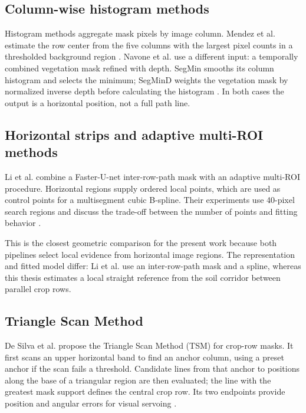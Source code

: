 \subsection{Column-wise histogram methods}
\label{subsec:metodi_locali}

Histogram methods aggregate mask pixels by image column. Mendez et al.
estimate the row center from the five columns with the largest pixel
counts in a thresholded background region
\cite[Section~3.4.3]{mendez2023vineyards}. Navone et al. use a different
input: a temporally combined vegetation mask refined with depth. SegMin
smooths its column histogram and selects the minimum; SegMinD weights
the vegetation mask by normalized inverse depth before calculating the
histogram \cite[Section~3]{navone2025gpsfree}. In both cases the output
is a horizontal position, not a full path line.

\subsection{Horizontal strips and adaptive multi-ROI methods}
\label{subsec:strips}

Li et al. combine a Faster-U-net inter-row-path mask with an adaptive
multi-ROI procedure. Horizontal regions supply ordered local points,
which are used as control points for a multisegment cubic B-spline.
Their experiments use 40-pixel search regions and discuss the trade-off
between the number of points and fitting behavior
\cite[Section~2.2.3, Figure~9]{li2022multiroi}.

This is the closest geometric comparison for the present work because
both pipelines select local evidence from horizontal image regions.
The representation and fitted model differ: Li et al. use an
inter-row-path mask and a spline, whereas this thesis estimates a local
straight reference from the soil corridor between parallel crop rows.

\subsection{Triangle Scan Method}
\label{subsec:triangle_scan}

De Silva et al. propose the Triangle Scan Method (TSM) for crop-row
masks. It first scans an upper horizontal band to find an anchor column,
using a preset anchor if the scan fails a threshold. Candidate lines
from that anchor to positions along the base of a triangular region are
then evaluated; the line with the greatest mask support defines the
central crop row. Its two endpoints provide position and angular errors
for visual servoing \cite[Section~4.2, Algorithm~1]{silva2023rowdetection}.

